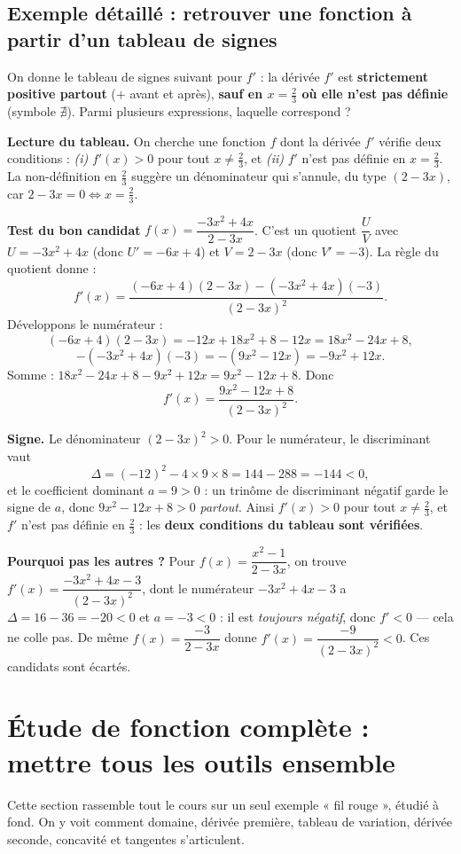 \documentclass[11pt,a4paper]{article}
\begin{document}
\subsection{Exemple détaillé : retrouver une fonction à partir d'un tableau de signes}

\begin{exemple}
On donne le tableau de signes suivant pour $f'$ : la dérivée $f'$ est \textbf{strictement positive
partout} ($+$ avant et après), \textbf{sauf en $x=\tfrac23$ où elle n'est pas définie}
(symbole $\nexists$). Parmi plusieurs expressions, laquelle correspond ?

\medskip
\textbf{Lecture du tableau.} On cherche une fonction $f$ dont la dérivée $f'$ vérifie deux conditions :
\emph{(i)} $f'(x)>0$ pour tout $x\neq\tfrac23$, et \emph{(ii)} $f'$ n'est pas définie en $x=\tfrac23$.
La non-définition en $\tfrac23$ suggère un dénominateur qui s'annule, du type $(2-3x)$, car
$2-3x=0\Leftrightarrow x=\tfrac23$.

\medskip
\textbf{Test du bon candidat} $f(x)=\dfrac{-3x^2+4x}{2-3x}$. C'est un quotient $\dfrac{U}{V}$ avec
$U=-3x^2+4x$ (donc $U'=-6x+4$) et $V=2-3x$ (donc $V'=-3$). La règle du quotient donne :
\[
   f'(x)=\frac{(-6x+4)(2-3x)-(-3x^2+4x)(-3)}{(2-3x)^2}.
\]
Développons le numérateur :
\[
   (-6x+4)(2-3x)=-12x+18x^2+8-12x=18x^2-24x+8,
\]
\[
   -(-3x^2+4x)(-3)=-(9x^2-12x)=-9x^2+12x.
\]
Somme : $18x^2-24x+8-9x^2+12x=9x^2-12x+8$. Donc
\[
   f'(x)=\frac{9x^2-12x+8}{(2-3x)^2}.
\]

\textbf{Signe.} Le dénominateur $(2-3x)^2>0$. Pour le numérateur, le discriminant vaut
\[
   \Delta=(-12)^2-4\times 9\times 8=144-288=-144<0,
\]
et le coefficient dominant $a=9>0$ : un trinôme de discriminant négatif garde le signe de $a$, donc
$9x^2-12x+8>0$ \emph{partout}. Ainsi $f'(x)>0$ pour tout $x\neq\tfrac23$, et $f'$ n'est pas définie en
$\tfrac23$ : les \textbf{deux conditions du tableau sont vérifiées}.

\medskip
\textbf{Pourquoi pas les autres ?} Pour $f(x)=\dfrac{x^2-1}{2-3x}$, on trouve
$f'(x)=\dfrac{-3x^2+4x-3}{(2-3x)^2}$, dont le numérateur $-3x^2+4x-3$ a $\Delta=16-36=-20<0$ et $a=-3<0$ :
il est \emph{toujours négatif}, donc $f'<0$ — cela ne colle pas. De même $f(x)=\dfrac{-3}{2-3x}$ donne
$f'(x)=\dfrac{-9}{(2-3x)^2}<0$. Ces candidats sont écartés.
\end{exemple}

\section{Étude de fonction complète : mettre tous les outils ensemble}
\label{sec:synthese}
Cette section rassemble tout le cours sur un seul exemple « fil rouge », étudié à fond. On y voit
comment domaine, dérivée première, tableau de variation, dérivée seconde, concavité et tangentes
s'articulent.
\end{document}

